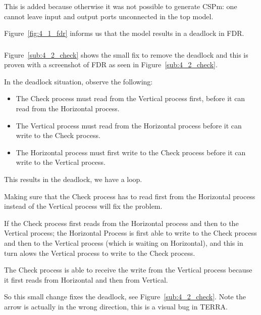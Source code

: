 \documentclass[a4paper,twoside,11pt]{article}
\begin{document}
This is added because otherwise it was not possible to generate CSPm: one 
cannot leave input and output ports unconnected in the top model.

Figure~\ref{fig:4_1_fdr} informs us that the model results in a deadlock in FDR.

\subsubsection{}
Figure~\ref{sub:4_2_check} shows the small fix to remove the deadlock and this 
is proven with a screenshot of FDR as seen in Figure~\ref{sub:4_2_check}. 

In the deadlock situation, observe the following:

\begin{itemize}
	\item The Check process must read from the Vertical process first,
		before it can read from the Horizontal process.

	\item The Vertical process must read from the Horizontal process before
	       	it can write to the Check process.

	\item The Horizontal process must first write to the Check process before 
		it can write to the Vertical process.
\end{itemize}
This results in the deadlock, we have a loop.
\smallskip

Making sure that the Check process has to read first from the Horizontal process 
instead of the Vertical process will fix the problem.

If the Check process first reads from the Horizontal process and then to the Vertical
process; the Horizontal Process is first able to write to the Check process and 
then to the Vertical process 
(which is waiting on Horizontal), and this in turn alows the Vertical process to write to the Check process.

The Check process is able to receive the write from the Vertical process because it first reads from Horizontal and then from Vertical.

\smallskip
So this small change fixes the deadlock, see Figure~\ref{sub:4_2_check}.
Note the arrow is actually in the wrong direction, this is a visual bug in TERRA.
\end{document}
